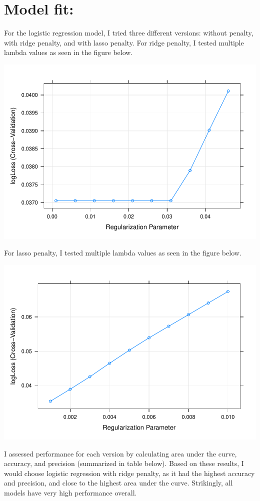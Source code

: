 \documentclass[
  english,
  man]{apa6}
\begin{document}
\hypertarget{model-fit}{%
\section{Model fit:}\label{model-fit}}

For the logistic regression model, I tried three different versions: without penalty, with ridge penalty, and with lasso penalty. For ridge penalty, I tested multiple lambda values as seen in the figure below.

\includegraphics{Babu_Final_files/figure-latex/ridge log-1.pdf}

For lasso penalty, I tested multiple lambda values as seen in the figure below.

\includegraphics{Babu_Final_files/figure-latex/lasso log-1.pdf}

I assessed performance for each version by calculating area under the curve, accuracy, and precision (summarized in table below). Based on these results, I would choose logistic regression with ridge penalty, as it had the highest accuracy and precision, and close to the highest area under the curve. Strikingly, all models have very high performance overall.
\end{document}
